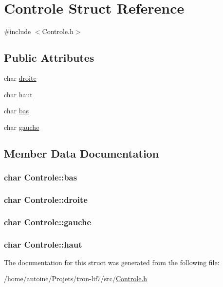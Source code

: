 \hypertarget{structControle}{\section{Controle Struct Reference}
\label{structControle}
}


{\ttfamily \#include $<$Controle.\-h$>$}

\subsection*{Public Attributes}
\begin{DoxyCompactItemize}
\item 
char \hyperlink{structControle_a039c43ca2fc16624cafa6c1705be5c44}{droite}
\item 
char \hyperlink{structControle_ab418ff3a6417f47b58d9ac1aeb663d72}{haut}
\item 
char \hyperlink{structControle_ae093c122530d43c686097b37eb37ab70}{bas}
\item 
char \hyperlink{structControle_a30a28c3a0423677177f939035d9c7be9}{gauche}
\end{DoxyCompactItemize}


\subsection{Member Data Documentation}
\hypertarget{structControle_ae093c122530d43c686097b37eb37ab70}{
\subsubsection[{bas}]{\setlength{\rightskip}{0pt plus 5cm}char Controle\-::bas}}\label{structControle_ae093c122530d43c686097b37eb37ab70}
\hypertarget{structControle_a039c43ca2fc16624cafa6c1705be5c44}{
\subsubsection[{droite}]{\setlength{\rightskip}{0pt plus 5cm}char Controle\-::droite}}\label{structControle_a039c43ca2fc16624cafa6c1705be5c44}
\hypertarget{structControle_a30a28c3a0423677177f939035d9c7be9}{
\subsubsection[{gauche}]{\setlength{\rightskip}{0pt plus 5cm}char Controle\-::gauche}}\label{structControle_a30a28c3a0423677177f939035d9c7be9}
\hypertarget{structControle_ab418ff3a6417f47b58d9ac1aeb663d72}{
\subsubsection[{haut}]{\setlength{\rightskip}{0pt plus 5cm}char Controle\-::haut}}\label{structControle_ab418ff3a6417f47b58d9ac1aeb663d72}


The documentation for this struct was generated from the following file\-:\begin{DoxyCompactItemize}
\item 
/home/antoine/\-Projets/tron-\/lif7/src/\hyperlink{Controle_8h}{Controle.\-h}\end{DoxyCompactItemize}
